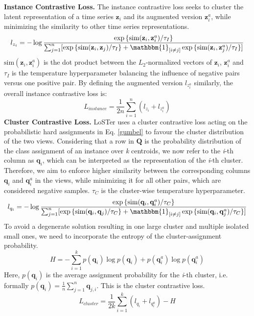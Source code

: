 \documentclass[times, review, 10pt]{elsarticle}
\begin{document}
\textbf{Instance Contrastive Loss.} The instance contrastive loss seeks to cluster the latent representation of a time series $\mathbf{z}_i$ and its augmented version $\mathbf{z}_i^a$, while minimizing the similarity to other time series representations.
%
\begin{equation} \label{instance_contrastive_loss}
    l_{z_i} = -\log{\frac{\exp{\{\text{sim}(\mathbf{z}_i, \mathbf{z}_i^a) / \tau_I}\}}{\sum_{j=1}^n [\exp{\{ \text{sim}(\mathbf{z}_i, \mathbf{z}_j) / \tau_I \}} + \mathbbm{1}_{[i \neq j]} \exp{\{ \text{sim}(\mathbf{z}_i, \mathbf{z}_j^a) / \tau_I \}}]}}
\end{equation}
%
$\text{sim}(\mathbf{z}_i,\mathbf{z}_i^a)$ is the dot product between the $L_2$-normalized vectors of $\mathbf{z}_i$, $\mathbf{z}_i^a$ and $\tau_I$ is the temperature hyperparameter balancing the influence of negative pairs versus one positive pair. By defining the augmented version $l_{z_i^a}$ similarly, the overall instance contrastive loss is:
%
\begin{equation}
    L_{instance} = \frac{1}{2n} \sum_{i=1}^n (l_{z_i} + l_{z_i^a})
\end{equation}
%
\textbf{Cluster Contrastive Loss.} LoSTer uses a cluster contrastive loss acting on the probabilistic hard assignments in Eq. \ref{gumbel} to favour the cluster distribution of the two views. Considering that a row in $\mathbf{Q}$ is the probability distribution of the class assignment of an instance over \textit{k} centroids, we now refer to the \emph{i}-th column as $\mathbf{q}_i$, which can be interpreted as the representation of the \emph{i}-th cluster. Therefore, we aim to enforce higher similarity between the corresponding columns $\mathbf{q}_i$ and $\mathbf{q}_i^a$ in the views, while minimizing it for all other pairs, which are considered negative samples. $\tau_C$ is the cluster-wise temperature hyperparameter.
%
\begin{equation} \label{cluster_contrastive_loss}
    l_{q_i} = -\log{\frac{\exp{\{\text{sim}(\mathbf{q}_i, \mathbf{q}_i^a) / \tau_C}\}}{\sum_{j=1}^n [\exp{\{ \text{sim}(\mathbf{q}_i, \mathbf{q}_j) / \tau_C \}} + \mathbbm{1}_{[i \neq j]} \exp{\{ \text{sim}(\mathbf{q}_i, \mathbf{q}_j^a) / \tau_C \}}]}}
\end{equation}
%
To avoid a degenerate solution resulting in one large cluster and multiple isolated small ones, we need to incorporate the entropy of the cluster-assignment probability.
%
\begin{equation} \label{cluster_entropy}
    H = -\sum_{i=1}^k p(\mathbf{q}_i) \log p(\mathbf{q}_i) + p(\mathbf{q}_i^a) \log p(\mathbf{q}_i^a)
\end{equation}
%
Here, $p(\mathbf{q}_i)$ is the average assignment probability for the \emph{i}-th cluster, i.e. formally $p(\mathbf{q}_i) = \frac{1}{n} \sum_{j=1}^n \mathbf{q}_{j,i}$. This is the cluster contrastive loss.
%
\begin{equation}
    L_{cluster} = \frac{1}{2k} \sum_{i=1}^k (l_{q_i} + l_{q_i^a}) - H
\end{equation}
\end{document}
